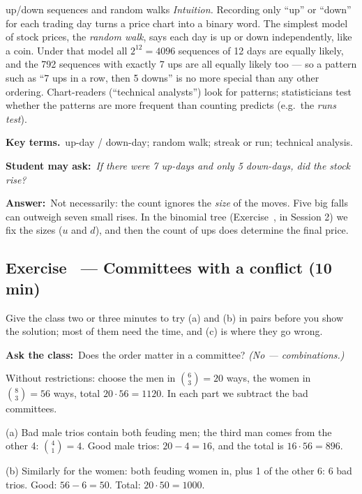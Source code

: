 \documentclass[11pt,a4paper,parskip=half]{scrartcl}
\newcommand{\terms}{\par\textbf{\color{plum}Key terms.}\ }
\newcommand{\sq}[1]{\par\textbf{\color{plum}Student may ask:}\ \emph{#1}\par}
\newcommand{\ans}{\textbf{Answer:}\ }
\newcommand{\ask}{\textbf{\color{navy}Ask the class:}\ }
\newcommand{\slide}[1]{\marginpar{\raggedright\footnotesize\color{gray}slide #1}}
\begin{document}
\begin{bg}{up/down sequences and random walks}
	\emph{Intuition.} Recording only ``up'' or ``down'' for each trading day
	turns a price chart into a binary word. The simplest model of stock prices,
	the \emph{random walk}, says each day is up or down independently, like a
	coin. Under that model all $2^{12} = 4096$ sequences of 12 days are equally
	likely, and the 792 sequences with exactly 7 ups are all equally likely too
	--- so a pattern such as ``7 ups in a row, then 5 downs'' is no more
	special than any other ordering. Chart-readers (``technical analysts'')
	look for patterns; statisticians test whether the patterns are more
	frequent than counting predicts (e.g.\ the \emph{runs test}).

	\terms up-day / down-day; random walk; streak or run; technical analysis.

	\sq{If there were 7 up-days and only 5 down-days, did the stock rise?}
	\ans Not necessarily: the count ignores the \emph{size} of the moves. Five
	big falls can outweigh seven small rises. In the binomial tree (Exercise~,
	in Session 2) we fix the sizes ($u$ and $d$), and then the
	count of ups does determine the final price.
\end{bg}

\subsection{Exercise~ --- Committees with a conflict (10 min)}\slide{14}


\begin{cue}
	Give the class two or three minutes to try (a) and (b) in pairs before
	you show the solution; most of them need the time, and (c) is where they
	go wrong.
\end{cue}

\ask Does the order matter in a committee? \emph{(No --- combinations.)}

Without restrictions: choose the men in $\binom63 = 20$ ways, the women in
$\binom83 = 56$ ways, total $20\cdot56 = 1120$. In each part we subtract the
bad committees.

(a) Bad male trios contain both feuding men; the third man comes from the
other 4: $\binom41 = 4$. Good male trios: $20-4 = 16$, and the total is
$16\cdot56 = 896$.

(b) Similarly for the women: both feuding women in, plus 1 of the other 6:
$6$ bad trios. Good: $56-6 = 50$. Total: $20\cdot 50 = 1000$.
\end{document}
